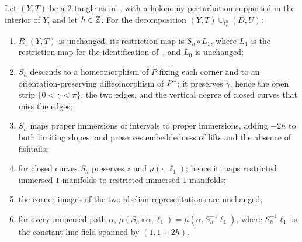\begin{lemma}\label{lem:shear}
Let $(Y,T)$ be a $2$-tangle as in~\cite[(17)]{HHK2}, with a holonomy perturbation supported in the interior of $Y$, and
let $h\in\mathbb{Z}$. For the decomposition $(Y,T)\cup_{t_e^h}(D,U)$:
\begin{enumerate}
\item[(a)] $R_\pi(Y,T)$ is unchanged, its restriction map is $S_h\circ L_1$, where $L_1$ is the restriction map for the
identification of~\cite[(17)]{HHK2}, and $L_0$ is unchanged;
\item[(b)] $S_h$ descends to a homeomorphism of $P$ fixing each corner and to an orientation-preserving
diffeomorphism of $P^{*}$; it preserves $\gamma$, hence the open strip $\{0<\gamma<\pi\}$, the two edges, and the vertical
degree of closed curves that miss the edges;
\item[(c)] $S_h$ maps proper immersions of intervals to proper immersions, adding $-2h$ to both limiting slopes, and
preserves embeddedness of lifts and the absence of fishtails;
\item[(d)] for closed curves $S_h$ preserves $z$ and $\mu(\cdot,\ell_1)$; hence it maps restricted immersed
$1$-manifolds to restricted immersed $1$-manifolds;
\item[(e)] the corner images of the two abelian representations are unchanged;
\item[(f)] for every immersed path $\alpha$, $\mu(S_h\circ\alpha,\ell_1)=\mu(\alpha,S_h^{-1}\ell_1)$, where $S_h^{-1}\ell_1$ is the
constant line field spanned by $(1,1+2h)$.
\end{enumerate}
\end{lemma}

